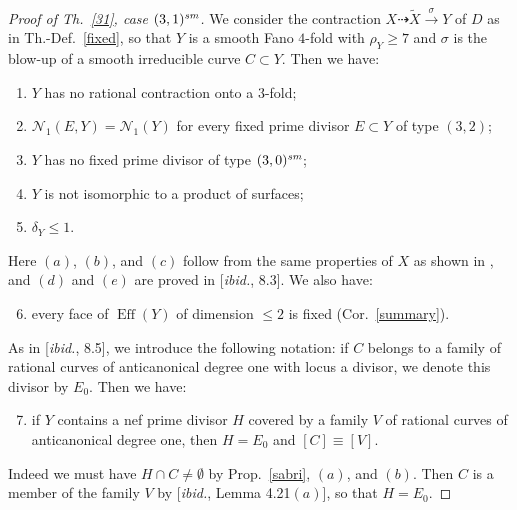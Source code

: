 \documentclass[a4paper,12pt]{amsart}
\theoremstyle{definition}
\numberwithin{figure}{section}
\numberwithin{table}{section}
\newcommand{\w}{\widetilde}
\newcommand{\N}{\mathcal{N}_1}
\newcommand{\Eff}{\operatorname{Eff}}
\newcommand{\sm}{\text{\it sm}}
\begin{document}
\begin{proof}[Proof of Th.~\ref{31}, case $(3,1)^{\sm}$]
We consider the contraction $X\dasharrow \w{X}\stackrel{\sigma}{\to} Y$ of $D$ as in Th.-Def.~\ref{fixed}, so that $Y$ is a smooth Fano $4$-fold with $\rho_Y\geq 7$ and $\sigma$ is the blow-up of a smooth irreducible curve $C\subset Y$. Then we have:
\begin{enumerate}[$(a)$]
  \item $Y$ has no rational contraction onto a $3$-fold;
    \item 
  $\N(E,Y)=\N(Y)$ for every fixed prime divisor $E\subset Y$ of type $(3,2)$;
\item $Y$ has no fixed prime divisor of type $(3,0)^{\sm}$;
  \item $Y$ is not isomorphic to a product of surfaces;
  \item $\delta_Y\leq 1$.
  \end{enumerate}
Here $(a)$, $(b)$, and $(c)$ follow from the same properties of $X$ as shown in 
 \cite[8.2]{small}, and $(d)$ and $(e)$ are proved in [\emph{ibid.}, 8.3].
We also have:
 \begin{enumerate}[$(a)$]\setcounter{enumi}{5}
    \item  every face of $\Eff(Y)$ of dimension $\leq 2$ is fixed (Cor.~\ref{summary}).
    \end{enumerate}
    
As in [\emph{ibid.}, 8.5], we introduce the following notation: if $C$ belongs to a family of rational curves of anticanonical degree one with locus a divisor, we denote this divisor by $E_0$. Then we have:
  \begin{enumerate}[$(a)$]\setcounter{enumi}{6}
  \item
    if $Y$ contains a nef prime divisor $H$ covered by a family $V$ of rational curves of anticanonical degree one, then $H=E_0$ and $[C]\equiv[V]$.
     \end{enumerate}
     Indeed we must have $H\cap C\neq\emptyset$ by Prop.~\ref{sabri}, $(a)$, and $(b)$. Then $C$ is a member of the family $V$ by [\emph{ibid.}, Lemma 4.21$(a)$], so that $H=E_0$.

     


\end{proof}
\end{document}

